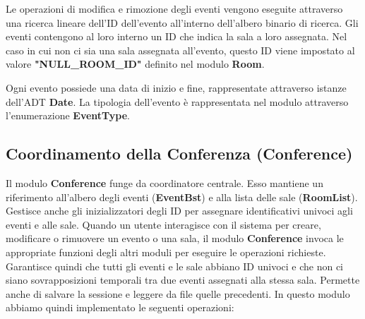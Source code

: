 \documentclass[11pt]{scrartcl} %
\begin{document}
Le operazioni di modifica e rimozione degli eventi vengono eseguite attraverso una ricerca lineare dell'ID dell'evento all'interno dell'albero binario di ricerca. Gli eventi contengono al loro interno un ID che indica la sala a loro assegnata. Nel caso in cui non ci sia una sala assegnata all'evento, questo ID viene impostato al valore \textbf{"NULL\_ROOM\_ID"} definito nel modulo \textbf{Room}.

Ogni evento possiede una data di inizio e fine, rappresentate attraverso istanze dell'ADT \textbf{Date}. La tipologia dell'evento è rappresentata nel modulo attraverso l'enumerazione \textbf{EventType}.


\subsection{Coordinamento della Conferenza (Conference)}
Il modulo \textbf{Conference} funge da coordinatore centrale. Esso mantiene un riferimento all'albero degli eventi (\textbf{EventBst}) e alla lista delle sale (\textbf{RoomList}). Gestisce anche gli inizializzatori degli ID per assegnare identificativi univoci agli eventi e alle sale. Quando un utente interagisce con il sistema per creare, modificare o rimuovere un evento o una sala, il modulo \textbf{Conference} invoca le appropriate funzioni degli altri moduli per eseguire le operazioni richieste. Garantisce quindi che tutti gli eventi e le sale abbiano ID univoci e che non ci siano sovrapposizioni temporali tra due eventi assegnati alla stessa sala. Permette anche di salvare la sessione e leggere da file quelle precedenti.
In questo modulo abbiamo quindi implementato le seguenti operazioni:
\end{document}
